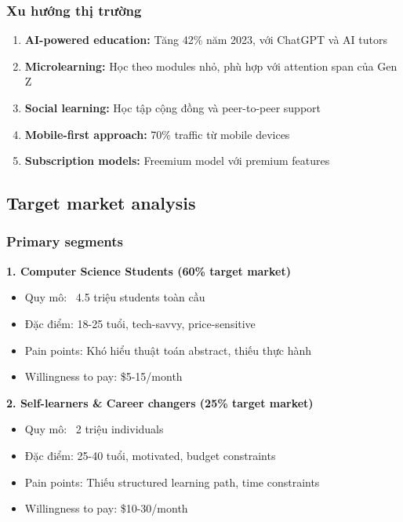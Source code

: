 \subsubsection{Xu hướng thị trường}

\begin{enumerate}
\item \textbf{AI-powered education:} Tăng 42\% năm 2023, với ChatGPT và AI tutors
\item \textbf{Microlearning:} Học theo modules nhỏ, phù hợp với attention span của Gen Z
\item \textbf{Social learning:} Học tập cộng đồng và peer-to-peer support
\item \textbf{Mobile-first approach:} 70\% traffic từ mobile devices
\item \textbf{Subscription models:} Freemium model với premium features
\end{enumerate}

\subsection{Target market analysis}
\label{subsec:target-market}

\subsubsection{Primary segments}

\textbf{1. Computer Science Students (60\% target market)}
\begin{itemize}
\item Quy mô: ~4.5 triệu students toàn cầu
\item Đặc điểm: 18-25 tuổi, tech-savvy, price-sensitive
\item Pain points: Khó hiểu thuật toán abstract, thiếu thực hành
\item Willingness to pay: \$5-15/month
\end{itemize}

\textbf{2. Self-learners & Career changers (25\% target market)}
\begin{itemize}
\item Quy mô: ~2 triệu individuals
\item Đặc điểm: 25-40 tuổi, motivated, budget constraints
\item Pain points: Thiếu structured learning path, time constraints
\item Willingness to pay: \$10-30/month
\end{itemize}

